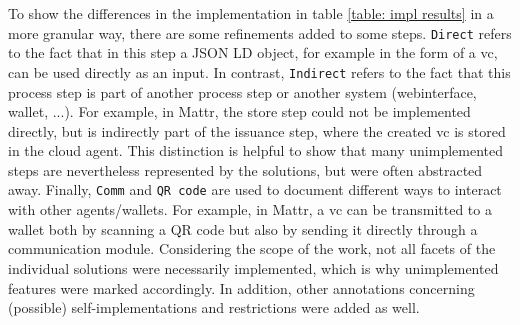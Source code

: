     To show the differences in the implementation in table \ref{table: impl results} in a more granular way, there are some refinements added to some steps. \texttt{Direct} refers to the fact that in this step a JSON LD object, for example in the form of a \ac{vc}, can be used directly as an input. In contrast, \texttt{Indirect} refers to the fact that this process step is part of another process step or another system (webinterface, wallet, ...). For example, in Mattr, the store step could not be implemented directly, but is indirectly part of the issuance step, where the created \ac{vc} is stored in the cloud agent. This distinction is helpful to show that many unimplemented steps are nevertheless represented by the solutions, but were often abstracted away. Finally, \texttt{Comm} and \texttt{QR code} are used to document different ways to interact with other agents/wallets. For example, in Mattr, a \ac{vc} can be transmitted to a wallet both by scanning a QR code but also by sending it directly through a communication module. Considering the scope of the work, not all facets of the individual solutions were necessarily implemented, which is why unimplemented features were marked accordingly. In addition, other annotations concerning (possible) self-implementations and restrictions were added as well.
     
